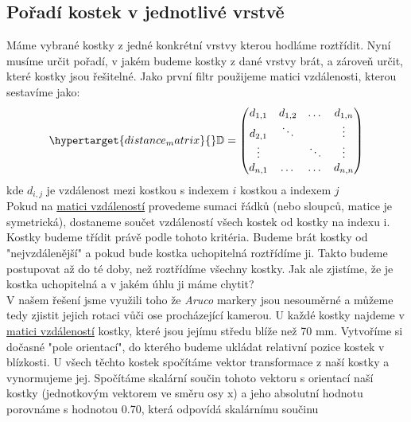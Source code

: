 \documentclass[journal,twoside,web]{ieeecolor}
\begin{document}
            \hypertarget{layer_sort}{\subsection{Pořadí kostek v jednotlivé vrstvě}}
            Máme vybrané kostky z jedné konkrétní vrstvy kterou hodláme roztřídit. Nyní musíme určit pořadí, v jakém budeme kostky z dané vrstvy brát, a zároveň určit,
            které kostky jsou řešitelné. Jako první filtr použijeme matici vzdálenosti, kterou sestavíme jako:\\
            \begin{equation}
                \hypertarget{distance_matrix}{}
                \mathbb{D} = \begin{pmatrix}d_{1,1} & d_{1,2} & \dots & d_{1, n}\\
                                            d_{2,1} & \ddots &  & \vdots\\
                                            \vdots & & \ddots & \vdots\\
                                            d_{n,1} & \dots & \dots & d_{n, n}\\ \end{pmatrix}
            \end{equation}
            kde $d_{i, j}$ je vzdálenost mezi kostkou s indexem $i$ kostkou a indexem $j$\\
            Pokud na \hyperlink{distance_matrix}{matici vzdáleností} provedeme sumaci řádků (nebo sloupců, matice je symetrická), dostaneme součet vzdáleností všech kostek
            od kostky na indexu i. Kostky budeme třídit právě podle tohoto kritéria. Budeme brát kostky od "nejvzdálenější" a pokud bude kostka uchopitelná roztřídíme ji. Takto budeme
            postupovat až do té doby, než roztřídíme všechny kostky. Jak ale zjistíme, že je kostka uchopitelná a v jakém úhlu ji máme chytit? \\
            V našem řešení jsme využili toho že \textit{Aruco} markery jsou nesouměrné a můžeme tedy zjistit jejich rotaci vůči ose procházející kamerou.
            U každé kostky najdeme v \hyperlink{distance_matrix}{matici vzdáleností} kostky, které jsou jejímu středu blíže než 70 mm.
            Vytvoříme si dočasné "pole orientací", do kterého budeme ukládat relativní pozice kostek v blízkosti.
            U všech těchto kostek spočítáme vektor transformace z naší kostky a vynormujeme jej. Spočítáme skalární součin tohoto vektoru
            s orientací naší kostky (jednotkovým vektorem ve směru osy x) a jeho absolutní hodnotu porovnáme s hodnotou 0.70, která odpovídá skalárnímu součinu
\end{document}
